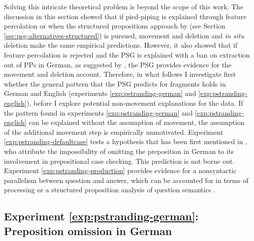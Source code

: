 Solving this intricate theoretical problem is beyond the scope of this work. The discussion in this section showed that if pied-piping is explained through feature percolation or when the structured propositions approach by \citet{reich2002} (see Section \ref{sec:psg-alternatives-structured}) is pursued, movement and deletion and \textit{in situ} deletion make the same empirical predictions. However, it also showed that if feature percolation is rejected and the PSG is explained with a ban on extraction out of PPs in German, as suggested by \citet{abels2003, abels2012}, the PSG provides evidence for the movement and deletion account. Therefore, in what follows I investigate first whether the general pattern that the PSG predicts for fragments holds in German and English (experiments \ref{exp:pstranding-german} and \ref{exp:pstranding-english}), before I explore potential non-movement explanations for the data. If the pattern found in experiments \ref{exp:pstranding-german} and \ref{exp:pstranding-english} can be explained without the assumption of movement, the assumption of the additional movement step is empirically unmotivated. Experiment \ref{exp:pstranding-defaultcase} tests a hypothesis that has been first mentioned in \citet{barton.progovac2005}, who attribute the impossibility of omitting the preposition in German to its involvement in prepositional case checking. This prediction is not borne out. Experiment \ref{exp:pstranding-production} provides evidence for a nonsyntactic parallelism between question and answer, which can be accounted for in terms of processing \citep{levelt.kelter1982, nykiel2017} or a structured proposition analysis of question semantics \citep{reich2002, reich2007}.


\label{exp:pstranding-german}
\subsection{Experiment \ref{exp:pstranding-german}: Preposition omission in German} 
\label{sec:pstranding-german}

